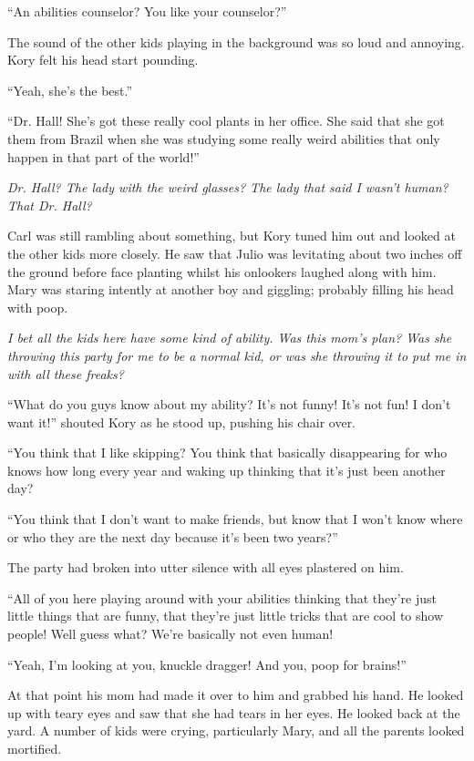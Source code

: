 ``An abilities counselor? You like your counselor?''

The sound of the other kids playing in the background was so loud and annoying. Kory felt his head start pounding.

``Yeah, she's the best.''

``Dr. Hall! She's got these really cool plants in her office. She said that she got them from Brazil when she was studying some really weird abilities that only happen in that part of the world!''

\textit{Dr. Hall? The lady with the weird glasses? The lady that said I wasn't human? That Dr. Hall?}

Carl was still rambling about something, but Kory tuned him out and looked at the other kids more closely. He saw that Julio was levitating about two inches off the ground before face planting whilst his onlookers laughed along with him. Mary was staring intently at another boy and giggling; probably filling his head with poop.

\textit{I bet all the kids here have some kind of ability. Was this mom's plan? Was she throwing this party for me to be a normal kid, or was she throwing it to put me in with all these freaks?}

``What do you guys know about my ability? It's not funny! It's not fun! I don't want it!'' shouted Kory as he stood up, pushing his chair over.

``You think that I like skipping? You think that basically disappearing for who knows how long every year and waking up thinking that it's just been another day?

``You think that I don't want to make friends, but know that I won't know where or who they are the next day because it's been two years?''

The party had broken into utter silence with all eyes plastered on him.

``All of you here playing around with your abilities thinking that they're just little things that are funny, that they're just little tricks that are cool to show people! Well guess what? We're basically not even human!

``Yeah, I'm looking at you, knuckle dragger! And you, poop for brains!''

At that point his mom had made it over to him and grabbed his hand. He looked up with teary eyes and saw that she had tears in her eyes. He looked back at the yard. A number of kids were crying, particularly Mary, and all the parents looked mortified.

